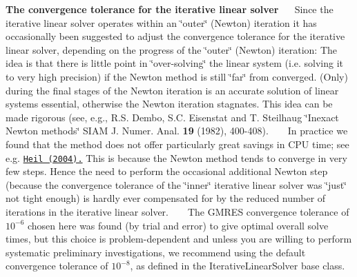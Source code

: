 \begin{DoxyEnumerate}
\item {\bfseries The convergence tolerance for the iterative linear solver}~\newline
~\newline
 Since the iterative linear solver operates within an \char`\"{}outer\char`\"{} (Newton) iteration it has occasionally been suggested to adjust the convergence tolerance for the iterative linear solver, depending on the progress of the \char`\"{}outer\char`\"{} (Newton) iteration\+: The idea is that there is little point in \char`\"{}over-\/solving\char`\"{} the linear system (i.\+e. solving it to very high precision) if the Newton method is still \char`\"{}far\char`\"{} from converged. (Only) during the final stages of the Newton iteration is an accurate solution of linear systems essential, otherwise the Newton iteration stagnates. This idea can be made rigorous (see, e.\+g., R.\+S. Dembo, S.\+C. Eisenstat and T. Steilhaug \char`\"{}\+Inexact Newton methods\char`\"{} S\+I\+AM J. Numer. Anal. {\bfseries 19} (1982), 400-\/408). ~\newline
~\newline
 In practice we found that the method does not offer particularly great savings in C\+PU time; see e.\+g. \href{http://www.sciencedirect.com/science?_ob=ArticleURL&_udi=B6V29-4B5C1C6-1&_user=494590&_rdoc=1&_fmt=&_orig=search&_sort=d&view=c&_acct=C000024058&_version=1&_urlVersion=0&_userid=494590&md5=1ed12ccb0a1535610fb2d11dca48a4e3}{\tt Heil (2004).} This is because the Newton method tends to converge in very few steps. Hence the need to perform the occasional additional Newton step (because the convergence tolerance of the \char`\"{}inner\char`\"{} iterative linear solver was \char`\"{}just\char`\"{} not tight enough) is hardly ever compensated for by the reduced number of iterations in the iterative linear solver. ~\newline
~\newline
 The G\+M\+R\+ES convergence tolerance of $ 10^{-6} $ chosen here was found (by trial and error) to give optimal overall solve times, but this choice is problem-\/dependent and unless you are willing to perform systematic preliminary investigations, we recommend using the default convergence tolerance of $ 10^{-8} $, as defined in the {\ttfamily Iterative\+Linear\+Solver} base class. ~\newline
~\newline


\end{DoxyEnumerate}

